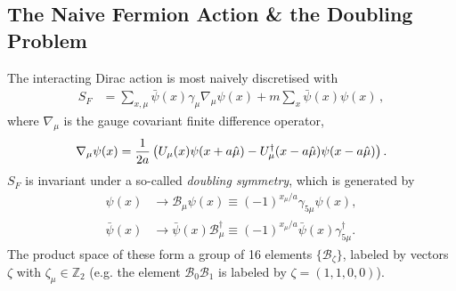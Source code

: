 \subsection{The Naive Fermion Action \& the Doubling Problem}
\label{sec:doubling_problem}

The interacting Dirac action is most naively discretised with
\begin{align}
  S_F &= \sum_{x,\mu} \bar{\psi}(x) \gamma_{\mu} \nabla_{\mu} \psi(x) + m\sum_x \bar{\psi}(x) \psi(x)\,,
  \label{eq:naivefermions}
\end{align}
where $\nabla_{\mu}$ is the gauge covariant finite difference operator,
\begin{align}
  \nabla_{\mu} \psi(x) = {1\over 2a} \left( U_{\mu} (x) \psi(x+a\hat{\mu}) - U^{\dagger}_{\mu}(x-a\hat{\mu})\psi(x-a\hat{\mu}) \right).
  \label{eq:lat_derivative}
\end{align}
$S_F$ is invariant under a so-called {\it{doubling symmetry}}, which is generated by
\begin{align}
  \label{eq:doublingsymmetry}
  \psi(x) & \to \mathcal{B}_{\mu} \psi(x) \equiv  (-1)^{x_{\mu}/a} \gamma_{5\mu} \psi(x), \\
  \bar{\psi}(x) & \to \bar{\psi}(x)\mathcal{B}^{\dagger}_{\mu} \equiv (-1)^{x_{\mu}/a} \bar{\psi}(x) \gamma^{\dagger}_{5\mu}.
\end{align}
The product space of these form a group of 16 elements $\{\mathcal{B}_{\zeta}\}$, labeled by vectors $\zeta$ with $\zeta_{\mu}\in \mathbb{Z}_2$ (e.g. the element $\mathcal{B}_{0}\mathcal{B}_{1}$ is labeled by $\zeta=(1,1,0,0)$).

